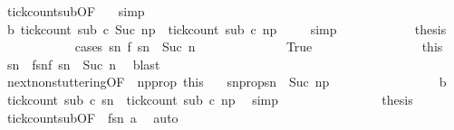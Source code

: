 \begin{isabellebody}
\ tick{\isacharunderscore}count{\isacharunderscore}sub{\isacharbrackleft}OF\ {\isacharasterisk}{\isacharbrackright}\ \isamarkupfalse%
\ simp\isanewline
\ \ \ \ \ \ \ \ \ \ \isamarkupfalse%
\ b{\isacharcolon}\ {\isacartoucheopen}tick{\isacharunderscore}count\ sub\ c\ {\isacharparenleft}Suc\ n\isactrlsub p{\isacharparenright}\ {\isasymle}\ tick{\isacharunderscore}count\ sub\ c\ n\isactrlsub p{\isacartoucheclose}\ \isamarkupfalse%
\ {}\ \isamarkupfalse%
\ simp\isanewline
\ \ \ \ \ \ \ \ \ \ \isamarkupfalse%
\ {\isacharquery}thesis\isanewline
\ \ \ \ \ \ \ \ \ \ \isamarkupfalse%
\ {\isacharparenleft}cases\ {\isacartoucheopen}{\isasymexists}sn\ f\ sn\ {\isacharequal}\ Suc\ n{\isacartoucheclose}{\isacharparenright}\isanewline
\ \ \ \ \ \ \ \ \ \ \ \ \isamarkupfalse%
\ True\ %
\isanewline
\ \ \ \ \ \ \ \ \ \ \ \ \ \ \isamarkupfalse%
\ this\ \isamarkupfalse%
\ sn\ \ fsn{\isacharcolon}{\isacartoucheopen}f\ sn\ {\isacharequal}\ Suc\ n{\isacartoucheclose}\ \isamarkupfalse%
\ blast\isanewline
\ \ \ \ \ \ \ \ \ \ \ \ \ \ \isamarkupfalse%
\ next{\isacharunderscore}non{\isacharunderscore}stuttering{\isacharbrackleft}OF\ {\isacharasterisk}\ np{\isacharunderscore}prop\ this{\isacharbrackright}\ \ \isamarkupfalse%
\ sn{\isacharunderscore}prop{\isacharcolon}{\isacartoucheopen}sn\ {\isacharequal}\ Suc\ n\isactrlsub p{\isacartoucheclose}\ \isacommand{{\isachardot}}\isamarkupfalse%
\isanewline
\ \ \ \ \ \ \ \ \ \ \ \ \ \ \isamarkupfalse%
\ b\ \isamarkupfalse%
\ {\isacartoucheopen}tick{\isacharunderscore}count\ sub\ c\ sn\ {\isasymle}\ tick{\isacharunderscore}count\ sub\ c\ n\isactrlsub p{\isacartoucheclose}\ \isamarkupfalse%
\ simp\isanewline
\ \ \ \ \ \ \ \ \ \ \ \ \ \ \isamarkupfalse%
\ {\isacharquery}thesis\ \isamarkupfalse%
\ tick{\isacharunderscore}count{\isacharunderscore}sub{\isacharbrackleft}OF\ {\isacharasterisk}{\isacharbrackright}\ fsn\ a\ \isamarkupfalse%
\ auto\isanewline
\ \ \ \ \ \ \ \ \ \ \isamarkupfalse%
\isanewline

\end{isabellebody}

